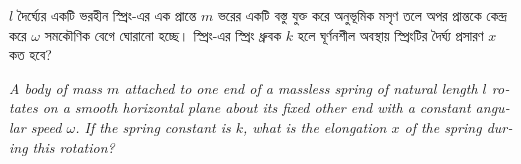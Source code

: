 \documentclass[12pt, a4paper]{article}
\begin{document}
{%
\begin{tcolorbox}[questionbox={প্রশ্ন (Question) 29}]
\noindent
$l$ দৈর্ঘ্যের একটি ভরহীন স্প্রিং-এর এক প্রান্তে $m$ ভরের একটি বস্তু যুক্ত করে অনুভূমিক মসৃণ তলে অপর প্রান্তকে কেন্দ্র করে $\omega$ সমকৌণিক বেগে ঘোরানো হচ্ছে। স্প্রিং-এর স্প্রিং ধ্রুবক $k$ হলে ঘূর্ণনশীল অবস্থায় স্প্রিংটির দৈর্ঘ্য প্রসারণ $x$ কত হবে?

\vspace{0.8em}
\begin{english}
\noindent\textit{\color{darkgray}
A body of mass $m$ attached to one end of a massless spring of natural length $l$ rotates on a smooth horizontal plane about its fixed other end with a constant angular speed $\omega$. If the spring constant is $k$, what is the elongation $x$ of the spring during this rotation?
}
\end{english}
\end{tcolorbox}

\vspace{1em}
\begin{center}
\end{center}}
\end{document}
